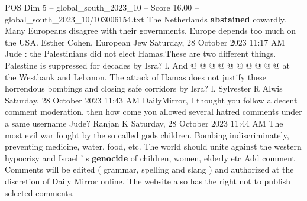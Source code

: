 \begin{textsample}{POS Dim 5 – global\_south\_2023\_10 – Score 16.00 – global\_south\_2023\_10/103006154.txt}
The Netherlands \textbf{abstained} cowardly.
Many Europeans disagree with their governments.
Europe depends too much on the USA.
Esther Cohen, European Jew Saturday, 28 October 2023 11:17 AM Jude : the Palestinians did not elect Hamas.These are two different things.
Palestine is suppressed for decades by Isra? l.
And @ @ @ @ @ @ @ @ @ @ at the Westbank and Lebanon.
The attack of Hamas does not justify these horrendous bombings and closing safe corridors by Isra? l.
Sylvester R Alwis Saturday, 28 October 2023 11:43 AM DailyMirror, I thought you follow a decent comment moderation, then how come you allowed several hatred comments under a same username Jude?
Ranjan K Saturday, 28 October 2023 11:44 AM The most evil war fought by the so called gods children.
Bombing indiscriminately, preventing medicine, water, food, etc.
The world should unite against the western hypocrisy and Israel ' s \textbf{genocide} of children, women, elderly etc Add comment Comments will be edited ( grammar, spelling and slang ) and authorized at the discretion of Daily Mirror online.
The website also has the right not to publish selected comments.

\end{textsample}
